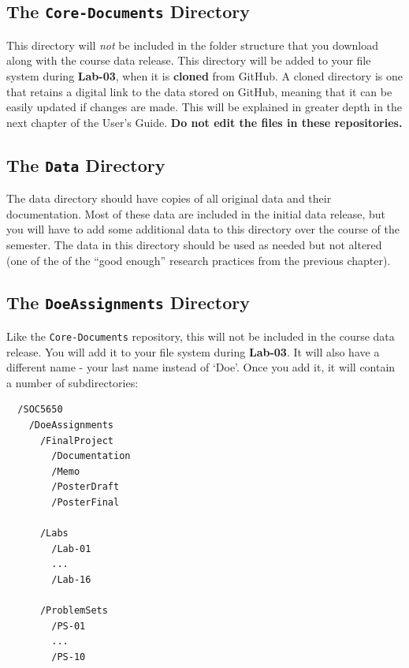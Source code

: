 \documentclass[]{book}
\theoremstyle{definition}
\theoremstyle{definition}
\theoremstyle{definition}
\theoremstyle{remark}
\begin{document}
\subsection{\texorpdfstring{The \texttt{Core-Documents}
Directory}{The Core-Documents Directory}}\label{the-core-documents-directory}

This directory will \emph{not} be included in the folder structure that
you download along with the course data release. This directory will be
added to your file system during \textbf{Lab-03}, when it is
\textbf{cloned} from GitHub. A cloned directory is one that retains a
digital link to the data stored on GitHub, meaning that it can be easily
updated if changes are made. This will be explained in greater depth in
the next chapter of the User's Guide. \textbf{Do not edit the files in
these repositories.}

\subsection{\texorpdfstring{The \texttt{Data}
Directory}{The Data Directory}}\label{the-data-directory}

The data directory should have copies of all original data and their
documentation. Most of these data are included in the initial data
release, but you will have to add some additional data to this directory
over the course of the semester. The data in this directory should be
used as needed but not altered (one of the of the ``good enough''
research practices from the previous chapter).

\subsection{\texorpdfstring{The \texttt{DoeAssignments}
Directory}{The DoeAssignments Directory}}\label{the-doeassignments-directory}

Like the \texttt{Core-Documents} repository, this will not be included
in the course data release. You will add it to your file system during
\textbf{Lab-03}. It will also have a different name - your last name
instead of `Doe'. Once you add it, it will contain a number of
subdirectories:

\begin{verbatim}
  /SOC5650
    /DoeAssignments
      /FinalProject
        /Documentation
        /Memo
        /PosterDraft
        /PosterFinal

      /Labs
        /Lab-01
        ...
        /Lab-16

      /ProblemSets
        /PS-01
        ...
        /PS-10
\end{verbatim}
\end{document}
